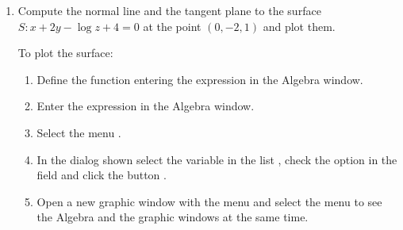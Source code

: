 \begin{enumerate}[leftmargin=*]
% 
% 
% 
\item Compute the normal line and the tangent plane to the surface $S: x+2y-\log z +4 =0$ at the point $(0,-2,1)$ and plot them.
\begin{indication}
To plot the surface:
\begin{enumerate}
\item Define the function entering the expression  in the Algebra window.
\item Enter the expression  in the Algebra window.
\item Select the menu .
\item In the dialog shown select the variable  in the list , check the option  in the field  and click the button .
\item Open a new graphic window with the menu  and select the menu  to see the Algebra and the graphic windows at the same time.

\end{enumerate}
\end{indication}
\end{enumerate}
